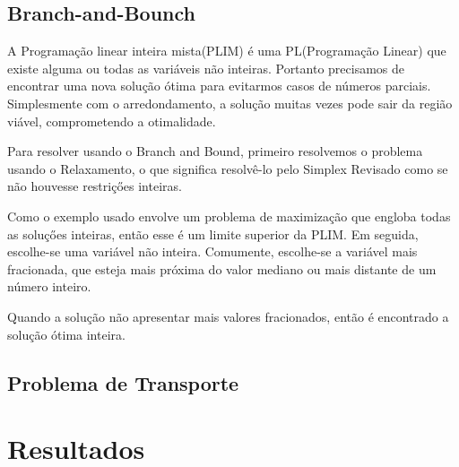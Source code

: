 \documentclass [11pt]{articleSBPO}
\begin{document}
\subsection{Branch-and-Bounch}

A Programação linear inteira mista(PLIM) é uma PL(Programação Linear) que existe alguma ou todas as variáveis não inteiras. Portanto precisamos de encontrar uma nova solução ótima para evitarmos casos de números parciais. Simplesmente com o arredondamento, a solução muitas vezes pode sair da região viável, comprometendo a otimalidade. 

Para resolver usando o Branch and Bound, primeiro resolvemos o problema usando o Relaxamento, o que significa resolvê-lo pelo Simplex Revisado como se não houvesse restriçőes inteiras.

Como o exemplo usado envolve um problema de maximização que engloba todas as soluçőes inteiras, então esse é um limite superior da PLIM. Em seguida, escolhe-se uma variável não inteira. Comumente, escolhe-se a variável mais fracionada, que esteja mais próxima do valor mediano ou mais distante de um número inteiro.

Quando a solução não apresentar mais valores fracionados, então é encontrado a solução ótima inteira. 

\subsection{Problema de Transporte}

\section{Resultados}
\label{sec:resultados}



\end{document}
